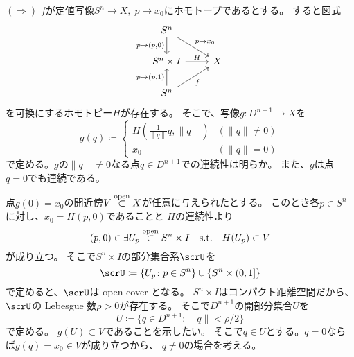 \documentclass[report]{jlreq}
\begin{document}
\begin{answer}
    $(\Rightarrow)$ \quad
    $f$が定値写像$S^n \to X,\; p \mapsto x_0$にホモトープであるとする。
    すると図式
    \begin{equation}
        \begin{tikzcd}
            S^n \ar{d}[swap]{p \mapsto (p, 0)} \ar{rd}{p \mapsto x_0} \\
            S^n \times I \ar{r}{H} & X \\
            S^n \ar{u}{p \mapsto (p, 1)} \ar{ru}[swap]{f}
        \end{tikzcd}
    \end{equation}
    を可換にするホモトピー$H$が存在する。
    そこで、写像$g \colon D^{n + 1} \to X$を
    \begin{equation}
        g(q) \coloneqq \begin{cases}
            H\left(\frac{1}{\|q\|} q, \|q\|\right) & (\|q\| \neq 0) \\
            x_0 & (\|q\| = 0)
        \end{cases}
    \end{equation}
    で定める。$g$の$\|q\| \neq 0$なる点$q \in D^{n + 1}$での連続性は明らか。
    また、$g$は点$q = 0$でも連続である。
    \begin{innerproof}
        点$g(0) = x_0$の開近傍$V \stackrel{\text{open}}{\subset} X$が任意に与えられたとする。
        このとき各$p \in S^n$に対し、$x_0 = H(p, 0)$であることと
        $H$の連続性より
        \begin{equation}
            (p, 0) \in \exists U_p \stackrel{\text{open}}{\subset} S^n \times I
            \quad \text{s.t.} \quad
            H(U_p) \subset V
        \end{equation}
        が成り立つ。
        そこで$S^n \times I$の部分集合系$\scrU$を
        \begin{equation}
            \scrU \coloneqq \{ U_p \colon p \in S^n \} \cup \{ S^n \times (0, 1] \}
        \end{equation}
        で定めると、$\scrU$は open cover となる。
        $S^n \times I$はコンパクト距離空間だから、
        $\scrU$の Lebesgue 数$\rho > 0$が存在する。
        そこで$D^{n + 1}$の開部分集合$U$を
        \begin{equation}
            U \coloneqq \{ q \in D^{n + 1} \colon \|q\| < \rho / 2 \}
        \end{equation}
        で定める。
        $g(U) \subset V$であることを示したい。
        そこで$q \in U$とする。$q = 0$ならば$g(q) = x_0 \in V$が成り立つから、
        $q \neq 0$の場合を考える。

\end{innerproof}
\end{answer}
\end{document}
